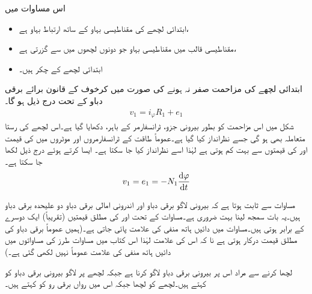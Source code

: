  اس مساوات میں
\begin{itemize}
\item
{} ابتدائی لچھے کی مقناطیسی بہاو کے ساتھ ارتباط بہاو ہے،
\item
{} مقناطیسی قالب میں مقناطیسی بہاو جو دونوں لچھوں میں سے گزرتی ہے،
\item
{} ابتدائی لچھے کے چکر ہیں۔
\end{itemize}
%

ابتدائی لچھے کی مزاحمت  صفر نہ ہونے کی صورت میں کرخوف کے قانون برائے برقی دباو کے تحت درج ذیل ہو گا۔
\begin{align}\label{مساوات_ٹرانسفارمر_بیرونی_اندرونی_دباو_فرق}
v_1 = i_{\varphi} R_1+e_1
\end{align}
شکل  میں اس مزاحمت کو بطور بیرونی جزو، ٹرانسفارمر کے باہر، دکھایا گیا ہے۔اس لچھے کی رستا متعاملہ بھی ہو گی جسے نظرانداز کیا گیا ہے۔عموماً طاقت کے ٹرانسفارمروں اور موٹروں  میں  کی قیمت  اور  کی قیمتوں سے بہت کم ہوتی ہے لہٰذا اسے نظرانداز کیا جا سکتا ہے۔ ایسا کرتے ہوئے درج ذیل لکھا جا سکتا ہے۔
\begin{align}\label{مساوات_ٹرانسفارمر_بیرونی_اندرونی_دباو_تقریبا_برابر}
v_1 = e_1=-N_1 \frac{\dif \varphi}{\dif t}
\end{align}

مساوات  سے  ثابت ہوتا ہے کہ بیرونی لاگو برقی دباو  اور اندرونی امالی برقی دباو  دو علیحدہ برقی دباو ہیں۔یہ بات سمجھ لینا بہت ضروری ہے۔مساوات  کے تحت  اور  کی مطلق قیمتیں  (تقریباً) ایک دوسرے کے برابر ہوتی ہیں۔مساوات  میں دائیں ہاتھ منفی کی علامت پائی جاتی ہے۔(ہمیں عموماً برقی دباو کی مطلق  قیمت درکار ہوتی ہے نا کہ اس کی علامت لہٰذا اس کتاب میں مساوات   طرز کی مساواتوں میں دائیں ہاتھ منفی کی علامت عموماً نہیں لکھی گئی ہے۔)

لچھا  کرنے سے مراد اس پر بیرونی برقی دباو لاگو کرنا ہے  جبکہ لچھے پر لاگو بیرونی برقی دباو کو   کہتے ہیں۔لچھے  کو  لچھا جبکہ اس میں رواں برقی رو کو  کہتے ہیں۔

